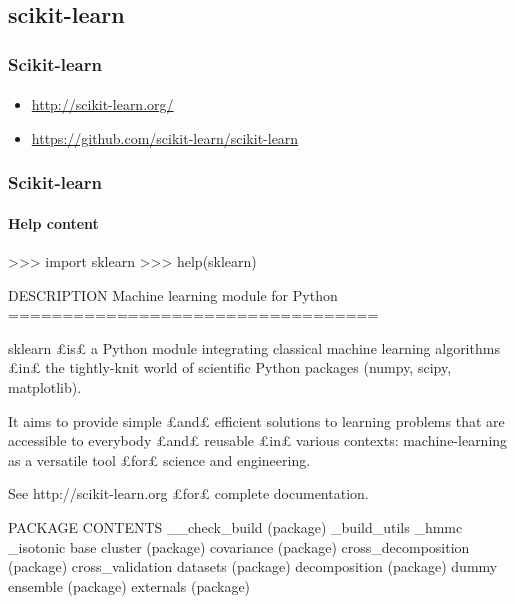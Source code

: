\subsection{scikit-learn}
\begin{frame}[fragile]
\frametitle{Scikit-learn}
\framesubtitle{}
\begin{itemize}
 \item \url{http://scikit-learn.org/} 
 \item \url{https://github.com/scikit-learn/scikit-learn} 
\end{itemize}
\end{frame}
\begin{frame}[fragile]
\frametitle{Scikit-learn}
\framesubtitle{Help content}
\begin{pythonConsole}
>>> import sklearn
>>> help(sklearn)

DESCRIPTION
    Machine learning module for Python
    ==================================
    
    sklearn £is£ a Python module integrating classical machine
    learning algorithms £in£ the tightly-knit world of scientific Python
    packages (numpy, scipy, matplotlib).
    
    It aims to provide simple £and£ efficient solutions to learning problems
    that are accessible to everybody £and£ reusable £in£ various contexts:
    machine-learning as a versatile tool £for£ science and engineering.
    
    See http://scikit-learn.org £for£ complete documentation.

PACKAGE CONTENTS
    __check_build (package)
    _build_utils
    _hmmc
    _isotonic
    base
    cluster (package)
    covariance (package)
    cross_decomposition (package)
    cross_validation
    datasets (package)
    decomposition (package)
    dummy
    ensemble (package)
    externals (package)
\end{pythonConsole}
\end{frame}
